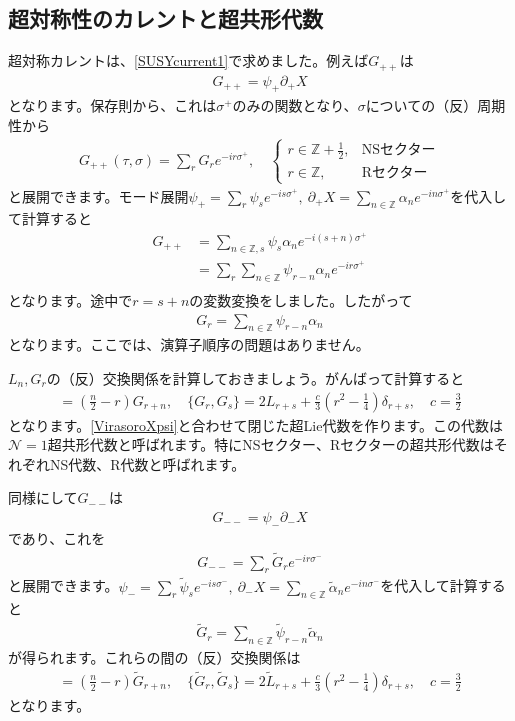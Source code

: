 \documentclass[report,paper=a4, fontsize=12pt, line_length=16cm, number_of_lines=33,dvipdfmx]{jlreq}
\numberwithin{equation}{chapter}
\numberwithin{equation}{section}
\newcommand{\Zb}{\mathbb{Z}}
\newcommand{\Ncal}{\mathcal{N}}
\newcommand{\del}{\partial}
\newcommand{\alphat}{\tilde{\alpha}}
\newcommand{\Lt}{\widetilde{L}}
\newcommand{\Gt}{\widetilde{G}}
\newcommand{\psit}{\tilde{\psi}}
\begin{document}
\subsection{超対称性のカレントと超共形代数}
超対称カレントは、\eqref{SUSYcurrent1}で求めました。例えば$G_{++}$は
\begin{align}
  G_{++}=\psi_{+}\del_{+}X
\end{align}
となります。保存則から、これは$\sigma^{+}$のみの関数となり、$\sigma$についての（反）周期性から
\begin{align}
  G_{++}(\tau,\sigma)=\sum_{r}G_{r}e^{-ir\sigma^{+}},\quad
  \begin{cases}
    r\in \Zb+\frac12,&\text{NSセクター}\\
    r\in \Zb,&\text{Rセクター}
  \end{cases}
\end{align}
と展開できます。モード展開$\psi_{+}=\sum_{r}\psi_{s}e^{-is\sigma^{+}},\ \del_{+}X=\sum_{n\in\Zb}\alpha_{n}e^{-in\sigma^{+}}$を代入して計算すると
\begin{align}
  G_{++}
  &=\sum_{n\in\Zb, s}\psi_{s}\alpha_{n}
  e^{-i(s+n)\sigma^{+}}\nonumber\\
  &=\sum_{r}\sum_{n\in\Zb}\psi_{r-n}\alpha_{n}
  e^{-ir\sigma^{+}}\nonumber\\
\end{align}
となります。途中で$r=s+n$の変数変換をしました。したがって
\begin{align}
  G_{r}=\sum_{n\in\Zb}\psi_{r-n}\alpha_{n}
\end{align}
となります。ここでは、演算子順序の問題はありません。

$L_n,G_r$の（反）交換関係を計算しておきましょう。がんばって計算すると
\begin{align}
  [L_n,G_r]=\left( \frac{n}{2} -r\right)G_{r+n},\quad
  \{G_r,G_s\}=2L_{r+s}+\frac{c}{3}\left( r^2-\frac{1}{4} \right)\delta_{r+s},\quad
  c=\frac{3}{2}
  \label{SCA}
\end{align}
となります。\eqref{VirasoroXpsi}と合わせて閉じた超Lie代数を作ります。この代数は$\Ncal=1$超共形代数と呼ばれます。特にNSセクター、Rセクターの超共形代数はそれぞれNS代数、R代数と呼ばれます。

同様にして$G_{--}$は
\begin{align}
  G_{--}=\psi_{-}\del_{-}X
\end{align}
であり、これを
\begin{align}
  G_{--}=\sum_{r}\Gt_{r}e^{-ir\sigma^{-}}
\end{align}
と展開できます。$\psi_{-}=\sum_{r}\psit_{s}e^{-is\sigma^{-}},\ \del_{-}X=\sum_{n\in\Zb}\alphat_{n}e^{-in\sigma^{-}}$を代入して計算すると
\begin{align}
  \Gt_{r}=\sum_{n\in\Zb}\psit_{r-n}\alphat_{n}
\end{align}
が得られます。これらの間の（反）交換関係は
\begin{align}
  [\Lt_n,\Gt_r]=\left( \frac{n}{2} -r\right)\Gt_{r+n},\quad
  \{\Gt_r,\Gt_s\}=2\Lt_{r+s}+\frac{c}{3}\left( r^2-\frac{1}{4} \right)\delta_{r+s},\quad
  c=\frac{3}{2}
\end{align}
となります。
\end{document}
